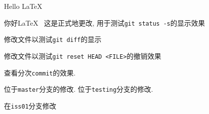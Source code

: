 \documentclass{ctexart}
\begin{document}
    Hello \LaTeX~

    你好\LaTeX~ %
    这是正式地更改, 用于测试\verb|git status -s|的显示效果

    修改文件以测试\verb|git diff|的显示

    修改文件以测试\verb|git reset HEAD <FILE>|的撤销效果

    查看分次\verb|commit|的效果. 

    位于\verb|master|分支的修改. 
    位于\verb|testing|分支的修改. 

    在\verb|iss01|分支修改
\end{document}
